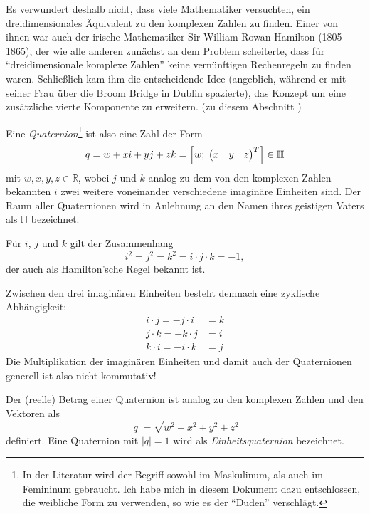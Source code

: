 Es verwundert deshalb nicht, dass viele Mathematiker versuchten, ein dreidimensionales Äquivalent zu den komplexen Zahlen zu finden. Einer von ihnen war auch der irische Mathematiker Sir William Rowan Hamilton (1805--1865), der wie alle anderen zunächst an dem Problem scheiterte, dass für \enquote{dreidimensionale komplexe Zahlen} keine vernünftigen Rechenregeln zu finden waren. Schließlich kam ihm die entscheidende Idee (angeblich, während er mit seiner Frau über die Broom Bridge in Dublin spazierte), das Konzept um eine zusätzliche vierte Komponente zu erweitern. (zu diesem Abschnitt )

Eine \emph{Quaternion}\footnote{In der Literatur wird der Begriff sowohl im Maskulinum, als auch im Femininum gebraucht. Ich habe mich in diesem Dokument dazu entschlossen, die weibliche Form zu verwenden, so wie es der \enquote{Duden} verschlägt.} ist also eine Zahl der Form
\begin{equation}
 q = w + xi + yj + zk = \left[ w ;\; \begin{pmatrix} x & y & z \end{pmatrix}^T \right] \in \mathbb H
\end{equation}
mit $w, x, y, z \in \mathbb R$, wobei $j$ und $k$ analog zu dem von den komplexen Zahlen bekannten $i$ zwei weitere voneinander verschiedene imaginäre Einheiten sind. Der Raum aller Quaternionen wird in Anlehnung an den Namen ihres geistigen Vaters als $\mathbb H$ bezeichnet.


Für $i$, $j$ und $k$ gilt der Zusammenhang
\begin{equation}
 i^2 = j^2 = k^2 = i \cdot j \cdot k = -1,
\end{equation} 
der auch als Hamilton'sche Regel bekannt ist.

Zwischen den drei imaginären Einheiten besteht demnach eine zyklische Abhängigkeit:
\begin{align}
 i \cdot j = -j \cdot i &= k \\
 j \cdot k = -k \cdot j &= i \\
 k \cdot i = -i \cdot k &= j
\end{align}
Die Multiplikation der imaginären Einheiten und damit auch der Quaternionen generell ist also nicht kommutativ!

Der (reelle) Betrag einer Quaternion ist analog zu den komplexen Zahlen und den Vektoren als 
\begin{equation}
 \left| q \right| = \sqrt{w^2 + x^2 + y^2 + z^2}
\end{equation}
definiert. Eine Quaternion mit $\left| q \right| = 1$ wird als \emph{Einheitsquaternion} bezeichnet.

